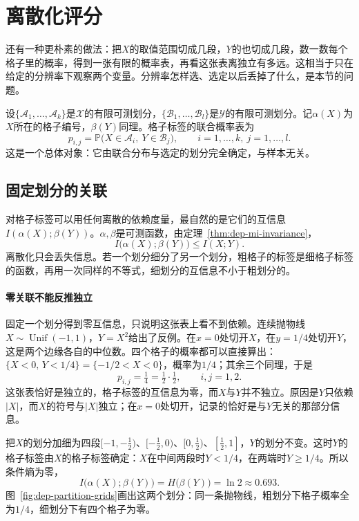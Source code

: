 \section{离散化评分}
\label{sec:dep-discretization}

还有一种更朴素的做法：把$X$的取值范围切成几段，$Y$的也切成几段，数一数每个格子里的概率，得到一张有限的概率表，再看这张表离独立有多远。这相当于只在给定的分辨率下观察两个变量。分辨率怎样选、选定以后丢掉了什么，是本节的问题。

设$\{\mathcal{A}_1,\dots,\mathcal{A}_k\}$是$\mathcal{X}$的有限可测划分，$\{\mathcal{B}_1,\dots,\mathcal{B}_l\}$是$\mathcal{Y}$的有限可测划分。记$\alpha(X)$为$X$所在的格子编号，$\beta(Y)$同理。格子标签的联合概率表为
\[
  p_{i,j}=\mathbb{P}\bigl(X\in\mathcal{A}_i,\ Y\in\mathcal{B}_j\bigr),\qquad i=1,\dots,k,\ j=1,\dots,l .
\]
这是一个总体对象：它由联合分布与选定的划分完全确定，与样本无关。

\subsection{固定划分的关联}
\label{sec:dep-fixed-partition}

对格子标签可以用任何离散的依赖度量，最自然的是它们的互信息$I(\alpha(X);\beta(Y))$。$\alpha,\beta$是可测函数，由定理~\ref{thm:dep-mi-invariance}，
\begin{equation}
  I\bigl(\alpha(X);\beta(Y)\bigr)\leq I(X;Y).
  \label{eq:dep-binned-mi-bound}
\end{equation}
离散化只会丢失信息。若一个划分细分了另一个划分，粗格子的标签是细格子标签的函数，再用一次同样的不等式，细划分的互信息不小于粗划分的。

\paragraph{零关联不能反推独立}
固定一个划分得到零互信息，只说明这张表上看不到依赖。连续抛物线$X\sim\operatorname{Unif}(-1,1)$，$Y=X^{2}$给出了反例。在$x=0$处切开$X$，在$y=1/4$处切开$Y$，这是两个边缘各自的中位数。四个格子的概率都可以直接算出：$\{X<0,\,Y<1/4\}=\{-1/2<X<0\}$，概率为$1/4$；其余三个同理，于是
\[
  p_{i,j}=\tfrac14=\tfrac12\cdot\tfrac12,\qquad i,j=1,2 .
\]
这张表恰好是独立的，格子标签的互信息为零，而$X$与$Y$并不独立。原因是$Y$只依赖$\lvert X\rvert$，而$X$的符号与$\lvert X\rvert$独立；在$x=0$处切开，记录的恰好是与$Y$无关的那部分信息。

把$X$的划分加细为四段$[-1,-\frac12)$、$[-\frac12,0)$、$[0,\frac12)$、$[\frac12,1]$，$Y$的划分不变。这时$Y$的格子标签由$X$的格子标签确定：$X$在中间两段时$Y<1/4$，在两端时$Y\geq1/4$。所以条件熵为零，
\[
  I\bigl(\alpha(X);\beta(Y)\bigr)=H\bigl(\beta(Y)\bigr)=\ln2\approx0.693 .
\]
图~\ref{fig:dep-partition-grids}画出这两个划分：同一条抛物线，粗划分下格子概率全为$1/4$，细划分下有四个格子为零。

